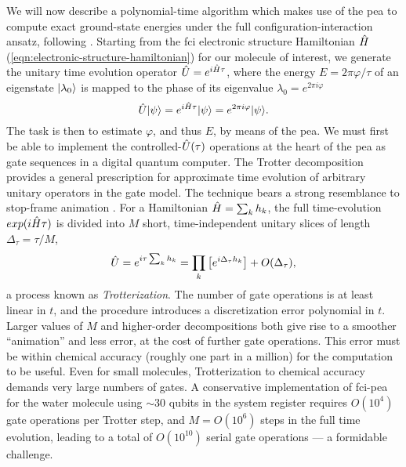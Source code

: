 We will now describe a polynomial-time algorithm which makes use of the \gls{pea} to compute exact ground-state energies under the full configuration-interaction ansatz, following \cite{Whitfield2011, Wecker2013}.
Starting from the \gls{fci} electronic structure Hamiltonian $\hat{H}$ (\ref{eqn:electronic-structure-hamiltonian}) for our molecule of interest, we generate the unitary time evolution operator $\hat{U} = e^{i \hat{H} \tau}$, where the energy $E=2\pi \varphi / \tau$ of an eigenstate $\mbox{$ | \lambda_0 \rangle $}$ is mapped to the phase of its eigenvalue $\lambda_0 = e^{2\pi i \varphi}$ 
\begin{equation}
    \hat{U} \mbox{$ | \psi \rangle $} = e^{i \hat{H} \tau} \mbox{$ | \psi \rangle $} = e^{2\pi i \varphi} \mbox{$ | \psi \rangle $}.
\end{equation}
The task is then to estimate $\varphi$, and thus $E$, by means of the \gls{pea}. We must first be able to implement the controlled-$\hat{U}(\tau)$ operations at the heart of the \gls{pea} as gate sequences in a digital quantum computer. The Trotter decomposition provides a general prescription for approximate time evolution of arbitrary unitary operators in the gate model. The technique bears a strong resemblance to stop-frame animation \cite{Johnston1981}. For a Hamiltonian $\hat{H} = \sum_k h_k$, the full time-evolution $exp(i\hat{H} \tau)$ is divided into $M$ short, time-independent unitary slices of length $\Delta_\tau = \tau/M$,
\begin{equation}
    \hat{U}=e^{i \tau \sum_k h_k } = \prod_k \left[ e^{i\Delta_\tau h_k}   \right] + O(\Delta_\tau),
\end{equation}
a process known as \emph{Trotterization}.
The number of gate operations is at least linear in $t$, and the procedure introduces a discretization error polynomial in $t$. Larger values of $M$ and higher-order decompositions both give rise to a smoother ``animation'' and less error, at the cost of further gate operations. This error must be within chemical accuracy (roughly one part in a million) for the computation to be useful. Even for small molecules, Trotterization to chemical accuracy demands very large numbers of gates. A conservative implementation of \gls{fci}-\gls{pea} for the water molecule using $\sim 30$ qubits in the system register requires $O(10^4)$ gate operations per Trotter step, and $M = O(10^6)$ steps in the full time evolution, leading to a total of $O(10^{10})$ serial gate operations \cite{Wecker2013} --- a formidable challenge.

